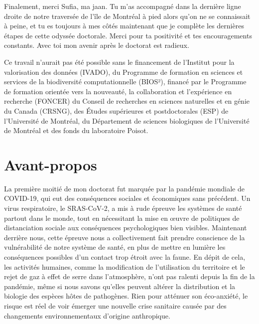 \documentclass[12pt,twoside,phd]{dms}
\numberwithin{equation}{section}
\numberwithin{table}{chapter}
\numberwithin{figure}{chapter}
\begin{document}
Finalement, merci Sufia, ma jaan. Tu m'as accompagné dans la dernière ligne
droite de notre traversée de l'île de Montréal à pied alors qu'on ne se
connaissait à peine, et tu es toujours à mes côtés maintenant que je complète
les dernières étapes de cette odyssée doctorale. Merci pour ta positivité et tes
encouragements constants. Avec toi mon avenir après le doctorat est radieux. 

Ce travail n'aurait pas été possible sans le financement de l'Institut pour la
valorisation des données (IVADO), du Programme de formation en sciences et
services de la biodiversité computationnelle (BIOS²), financé par le Programme
de formation orientée vers la nouveauté, la collaboration et l'expérience en
recherche (FONCER) du Conseil de recherches en sciences naturelles et en génie
du Canada (CRSNG), des Études supérieures et postdoctorales (ESP) de
l'Université de Montréal, du Département de sciences biologiques de l'Université
de Montréal et des fonds du laboratoire Poisot. 

\chapter*{Avant-propos}

La première moitié de mon doctorat fut marquée par la pandémie mondiale de
COVID-19, qui eut des conséquences sociales et économiques sans précédent. Un
virus respiratoire, le SRAS-CoV-2, a mis à rude épreuve les systèmes de santé
partout dans le monde, tout en nécessitant la mise en œuvre de politiques de
distanciation sociale aux conséquences psychologiques bien visibles. Maintenant
derrière nous, cette épreuve nous a collectivement fait prendre conscience de la
vulnérabilité de notre système de santé, en plus de mettre en lumière les
conséquences possibles d'un contact trop étroit avec la faune. En dépit de cela,
les activités humaines, comme la modification de l'utilisation du territoire et
le rejet de gaz à effet de serre dans l'atmosphère, n'ont pas ralenti depuis la
fin de la pandémie, même si nous savons qu'elles peuvent altérer la distribution
et la biologie des espèces hôtes de pathogènes. Rien pour atténuer son
éco-anxiété, le risque est réel de voir émerger une nouvelle crise
sanitaire causée par des changements environnementaux d'origine anthropique. 
\end{document}
